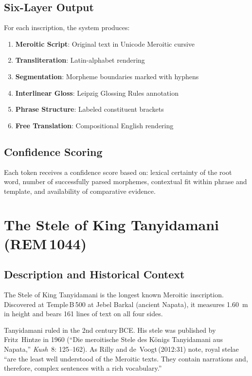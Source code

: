 \documentclass[11pt,a4paper]{article}
\begin{document}
\subsection{Six-Layer Output}

For each inscription, the system produces:
\begin{enumerate}[nosep]
  \item \textbf{Meroitic Script}: Original text in Unicode Meroitic cursive
  \item \textbf{Transliteration}: Latin-alphabet rendering
  \item \textbf{Segmentation}: Morpheme boundaries marked with hyphens
  \item \textbf{Interlinear Gloss}: Leipzig Glossing Rules annotation
  \item \textbf{Phrase Structure}: Labeled constituent brackets
  \item \textbf{Free Translation}: Compositional English rendering
\end{enumerate}

\subsection{Confidence Scoring}

Each token receives a confidence score based on: lexical certainty of the
root word, number of successfully parsed morphemes, contextual fit within
phrase and template, and availability of comparative evidence.


\section{The Stele of King Tanyidamani (REM\,1044)}

\subsection{Description and Historical Context}

The Stele of King Tanyidamani is the longest known Meroitic inscription.
Discovered at Temple\,B\,500 at Jebel Barkal (ancient Napata), it measures
1.60~m in height and bears 161 lines of text on all four sides.

Tanyidamani ruled in the 2nd century\,BCE. His stele was published by
Fritz~Hintze in 1960 (``Die meroitische Stele des Königs Tanyidamani aus
Napata,'' \textit{Kush}~8: 125--162). As Rilly and de~Voogt\,(2012:31) note,
royal stelae ``are the least well understood of the Meroitic texts. They
contain narrations and, therefore, complex sentences with a rich vocabulary.''
\end{document}
